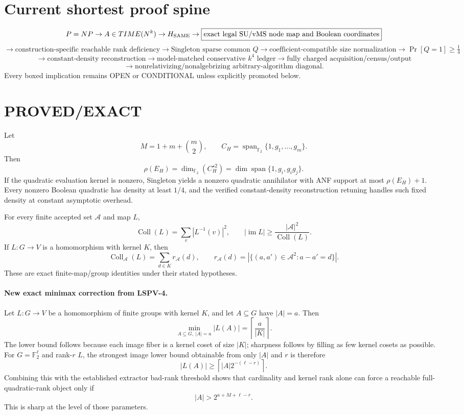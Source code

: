 \documentclass[11pt]{article}
\begin{document}
\section*{Current shortest proof spine}
\[
P=NP\to A\in TIME(N^k)\to H_{\rm SAME}
\to \boxed{\text{exact legal SU/vMS node map and Boolean coordinates}}
\]
\[
\to \boxed{\text{construction-specific reachable rank deficiency}}
\to \text{Singleton sparse common }Q
\to \boxed{\text{coefficient-compatible size normalization}}
\to \Pr[Q=1]\ge\tfrac14
\]
\[
\to \text{constant-density reconstruction}
\to \boxed{\text{model-matched conservative }k^4\text{ ledger}}
\to \boxed{\text{fully charged acquisition/census/output}}
\]
\[
\to \boxed{\text{nonrelativizing/nonalgebrizing arbitrary-algorithm diagonal}}.
\]
Every boxed implication remains OPEN or CONDITIONAL unless explicitly promoted below.

\section*{PROVED/EXACT}
Let
\[
M=1+m+\binom m2,\qquad C_H=\operatorname{span}_{\mathbb F_2}\{1,g_1,\ldots,g_m\}.
\]
Then
\[
\rho(E_H)=\dim_{\mathbb F_2}(C_H^{\star2})
=\dim\operatorname{span}\{1,g_i,g_i g_j\}.
\]
If the quadratic evaluation kernel is nonzero, Singleton yields a nonzero quadratic annihilator with ANF support at most $\rho(E_H)+1$. Every nonzero Boolean quadratic has density at least $1/4$, and the verified constant-density reconstruction retuning handles such fixed density at constant asymptotic overhead.

For every finite accepted set $\mathcal A$ and map $L$,
\[
\operatorname{Coll}(L)=\sum_v |L^{-1}(v)|^2,\qquad
|\operatorname{im}L|\ge\frac{|\mathcal A|^2}{\operatorname{Coll}(L)}.
\]
If $L:G\to V$ is a homomorphism with kernel $K$, then
\[
\operatorname{Coll}_{\mathcal A}(L)=\sum_{d\in K}r_{\mathcal A}(d),
\qquad
r_{\mathcal A}(d)=|\{(a,a')\in\mathcal A^2:a-a'=d\}|.
\]
These are exact finite-map/group identities under their stated hypotheses.

\paragraph{New exact minimax correction from LSPV-4.}
Let $L:G\to V$ be a homomorphism of finite groups with kernel $K$, and let $A\subseteq G$ have $|A|=a$. Then
\[
\boxed{\min_{A\subseteq G,\ |A|=a}|L(A)|=\left\lceil\frac{a}{|K|}\right\rceil.}
\]
The lower bound follows because each image fiber is a kernel coset of size $|K|$; sharpness follows by filling as few kernel cosets as possible. For $G=\mathbb F_2^\ell$ and rank-$r$ $L$, the strongest image lower bound obtainable from only $|A|$ and $r$ is therefore
\[
|L(A)|\ge\left\lceil |A|2^{-(\ell-r)}\right\rceil.
\]
Combining this with the established extractor bad-rank threshold shows that cardinality and kernel rank alone can force a reachable full-quadratic-rank object only if
\[
\boxed{|A|>2^{\kappa+M+\ell-r}.}
\]
This is sharp at the level of those parameters.
\end{document}
